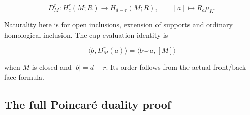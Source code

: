 \begin{equation}
D_M^r:H_c^r(M;R)\longrightarrow H_{d-r}(M;R),
\qquad [a]\longmapsto R_a\mu_K.
\label{courseIII:manifold-duality-the-diagonal-and-wu-classes.source:eq:1.4}
\end{equation}

Naturality here is for open inclusions, extension of supports and ordinary homological inclusion. The cap evaluation identity is

\begin{equation}
\langle b,D_M^r(a)\rangle=\langle b\smile a,[M]\rangle
\label{courseIII:manifold-duality-the-diagonal-and-wu-classes.source:eq:1.5}
\end{equation}

when \(M\) is closed and \(|b|=d-r\). Its order follows from the actual front/back face formula.

\subsection{The full Poincaré duality proof}
\label{courseIII:manifold-duality-the-diagonal-and-wu-classes.source:section-2}

\label{courseIII:duality:2.1}

